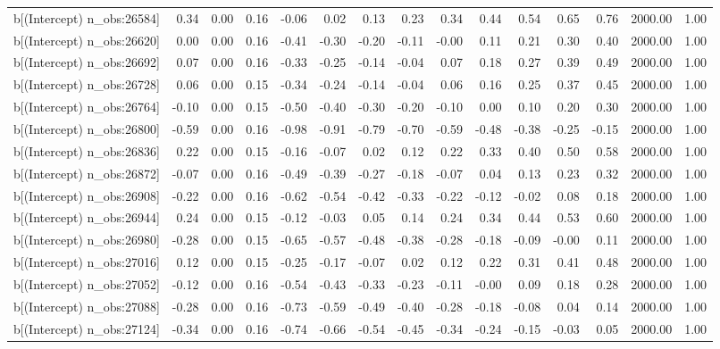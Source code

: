 \begin{table}[ht]
\begin{tabular}{rrrrrrrrrrrrrrr}
  b[(Intercept) n\_obs:26584] & 0.34 & 0.00 & 0.16 & -0.06 & 0.02 & 0.13 & 0.23 & 0.34 & 0.44 & 0.54 & 0.65 & 0.76 & 2000.00 & 1.00 \\ 
  b[(Intercept) n\_obs:26620] & 0.00 & 0.00 & 0.16 & -0.41 & -0.30 & -0.20 & -0.11 & -0.00 & 0.11 & 0.21 & 0.30 & 0.40 & 2000.00 & 1.00 \\ 
  b[(Intercept) n\_obs:26692] & 0.07 & 0.00 & 0.16 & -0.33 & -0.25 & -0.14 & -0.04 & 0.07 & 0.18 & 0.27 & 0.39 & 0.49 & 2000.00 & 1.00 \\ 
  b[(Intercept) n\_obs:26728] & 0.06 & 0.00 & 0.15 & -0.34 & -0.24 & -0.14 & -0.04 & 0.06 & 0.16 & 0.25 & 0.37 & 0.45 & 2000.00 & 1.00 \\ 
  b[(Intercept) n\_obs:26764] & -0.10 & 0.00 & 0.15 & -0.50 & -0.40 & -0.30 & -0.20 & -0.10 & 0.00 & 0.10 & 0.20 & 0.30 & 2000.00 & 1.00 \\ 
  b[(Intercept) n\_obs:26800] & -0.59 & 0.00 & 0.16 & -0.98 & -0.91 & -0.79 & -0.70 & -0.59 & -0.48 & -0.38 & -0.25 & -0.15 & 2000.00 & 1.00 \\ 
  b[(Intercept) n\_obs:26836] & 0.22 & 0.00 & 0.15 & -0.16 & -0.07 & 0.02 & 0.12 & 0.22 & 0.33 & 0.40 & 0.50 & 0.58 & 2000.00 & 1.00 \\ 
  b[(Intercept) n\_obs:26872] & -0.07 & 0.00 & 0.16 & -0.49 & -0.39 & -0.27 & -0.18 & -0.07 & 0.04 & 0.13 & 0.23 & 0.32 & 2000.00 & 1.00 \\ 
  b[(Intercept) n\_obs:26908] & -0.22 & 0.00 & 0.16 & -0.62 & -0.54 & -0.42 & -0.33 & -0.22 & -0.12 & -0.02 & 0.08 & 0.18 & 2000.00 & 1.00 \\ 
  b[(Intercept) n\_obs:26944] & 0.24 & 0.00 & 0.15 & -0.12 & -0.03 & 0.05 & 0.14 & 0.24 & 0.34 & 0.44 & 0.53 & 0.60 & 2000.00 & 1.00 \\ 
  b[(Intercept) n\_obs:26980] & -0.28 & 0.00 & 0.15 & -0.65 & -0.57 & -0.48 & -0.38 & -0.28 & -0.18 & -0.09 & -0.00 & 0.11 & 2000.00 & 1.00 \\ 
  b[(Intercept) n\_obs:27016] & 0.12 & 0.00 & 0.15 & -0.25 & -0.17 & -0.07 & 0.02 & 0.12 & 0.22 & 0.31 & 0.41 & 0.48 & 2000.00 & 1.00 \\ 
  b[(Intercept) n\_obs:27052] & -0.12 & 0.00 & 0.16 & -0.54 & -0.43 & -0.33 & -0.23 & -0.11 & -0.00 & 0.09 & 0.18 & 0.28 & 2000.00 & 1.00 \\ 
  b[(Intercept) n\_obs:27088] & -0.28 & 0.00 & 0.16 & -0.73 & -0.59 & -0.49 & -0.40 & -0.28 & -0.18 & -0.08 & 0.04 & 0.14 & 2000.00 & 1.00 \\ 
  b[(Intercept) n\_obs:27124] & -0.34 & 0.00 & 0.16 & -0.74 & -0.66 & -0.54 & -0.45 & -0.34 & -0.24 & -0.15 & -0.03 & 0.05 & 2000.00 & 1.00 \\ 

\end{tabular}
\end{table}
